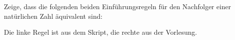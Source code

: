 \documentclass{uebung}
\begin{document}

\begin{exercise}
  Zeige, dass die folgenden beiden Einführungsregeln für den Nachfolger einer natürlichen Zahl äquivalent sind:
  {\tiny Die linke Regel ist aus dem Skript, die rechte aus der Vorlesung.}
\end{exercise}
\end{document}
